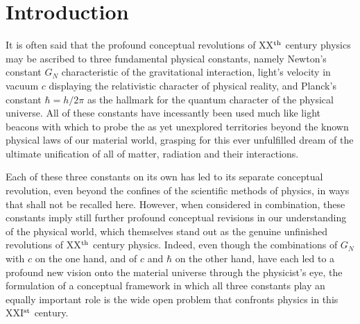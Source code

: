 \documentclass[a4paper,11pt]{article}
\begin{document}
\section{Introduction}
\label{Sect1}

It is often said that the profound conceptual revolutions of
XX$^{\rm th}$ century physics may be ascribed to three
fundamental physical constants, namely Newton's constant $G_N$
characteristic of the gravitational interaction, light's velocity
in vacuum $c$ displaying the relativistic character of physical
reality, and Planck's constant $\hbar=h/2\pi$ as the hallmark
for the quantum character of the physical universe. All of these
constants have incessantly been used much like light beacons with which
to probe the as yet unexplored territories beyond the known
physical laws of our material world, grasping for this
ever unfulfilled dream of the ultimate unification of all of matter,
radiation and their interactions.

Each of these three constants on its own has led to its separate
conceptual revolution, even beyond the confines of the scientific
methods of physics, in ways that shall not be recalled here. However,
when considered in combination, these constants imply still further profound
conceptual revisions in our understanding of the physical world, which 
themselves stand out as the ge\-nuine unfinished revolutions of XX$^{\rm th}$ 
century physics. Indeed, even though the combinations of $G_N$ with $c$ on the 
one hand, and of $c$ and $\hbar$ on the other hand, have each led to a profound
new vision onto the material universe through the physicist's eye,
the formulation of a conceptual framework in which all three constants
play an equally important role is the wide open problem that confronts
physics in this XXI$^{\rm st}$ century.
\end{document}
